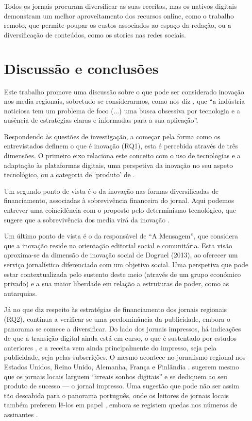 \documentclass[portuguese]{textolivre}
\begin{document}
Todos os jornais procuram diversificar as suas receitas, mas os nativos
digitais demonstram um melhor aproveitamento dos recursos online, como o
trabalho remoto, que permite poupar os custos associados ao espaço da
redação, ou a diversificação de conteúdos, como os stories nas redes
sociais.


\section{Discussão e conclusões}
Este trabalho promove uma discussão sobre o que pode ser considerado
inovação nos media regionais, sobretudo se considerarmos, como nos diz
\textcite[p.~7]{Posetti2018}, que ``a indústria noticiosa tem um problema de foco
(...) uma busca obsessiva por tecnologia e a ausência de estratégias
claras e informadas para a sua aplicação''.

Respondendo às questões de investigação, a começar pela forma como os
entrevistados definem o que é inovação (RQ1), esta é percebida através
de três dimensões. O primeiro eixo relaciona este conceito com o uso de
tecnologias e a adaptação às plataformas digitais, uma perspetiva da
inovação no seu aspeto tecnológico, ou a categoria de `produto' de
\textcite{Francis2005}.

Um segundo ponto de vista é o da inovação nas formas diversificadas de
financiamento, associadas à sobrevivência financeira do jornal. Aqui
podemos entrever uma coincidência com o proposto pelo determinismo
tecnológico, que sugere que a sobrevivência dos media virá da inovação
\cite{Francis2005,pavlik2013innovation}.

Um último ponto de vista é o da responsável de ``A Mensagem'', que
considera que a inovação reside na orientação editorial social e
comunitária. Esta visão aproxima-se da dimensão de inovação social de
Dogruel (2013), ao oferecer um serviço jornalístico diferenciado com um
objetivo social. Uma perspetiva que pode estar contextualizada pelo
sustento deste meio (através de um grupo económico privado) e a sua
maior liberdade em relação a estruturas de poder, como as autarquias.

Já no que diz respeito às estratégias de financiamento dos jornais
regionais (RQ2), continua a verificar-se uma predominância da
publicidade, embora o panorama se comece a diversificar. Do lado dos
jornais impressos, há indicações de que a transição digital ainda está
em curso, o que é sustentado por estudos anteriores \cite{Cardoso2018,Sjovaag2021}, e a receita vem ainda principalmente
do impresso, seja pela publicidade, seja pelas subscrições. O mesmo
acontece no jornalismo regional nos Estados Unidos, Reino Unido,
Alemanha, França e Finlândia \cite{Jenkins2017,Chyi2019}. \textcite{Chyi2019} sugerem mesmo que os jornais locais
larguem ``irreais sonhos digitais'' e se dediquem ao seu produto de
sucesso --- o jornal impresso. Uma sugestão que pode não ser assim tão
descabida para o panorama português, onde os leitores de jornais locais
também preferem lê-los em papel \cite{Cardoso2018}, embora se
registem quedas nos números de assinantes \cite{Foa2016}.
\end{document}
